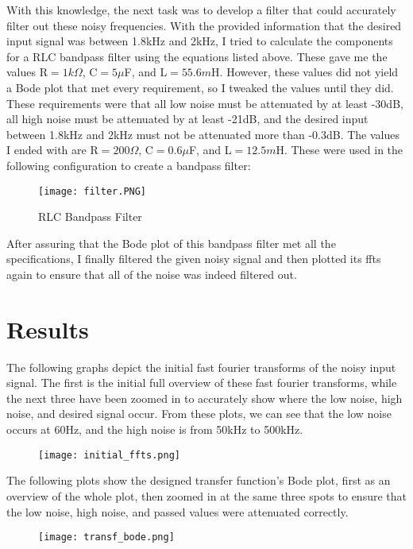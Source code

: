 \documentclass[12pt]{report}
\begin{document}
With this knowledge, the next task was to develop a filter that could accurately filter out these noisy frequencies. With the provided information that the desired input signal was between 1.8kHz and 2kHz, I tried to calculate the components for a RLC bandpass filter using the equations listed above. These gave me the values R$=1k\Omega$, C$=5\mu $F, and L$=55.6m$H. However, these values did not yield a Bode plot that met every requirement, so I tweaked the values until they did. These requirements were that all low noise must be attenuated by at least -30dB, all high noise must be attenuated by at least -21dB, and the desired input between 1.8kHz and 2kHz must not be attenuated more than -0.3dB. The values I ended with are R$=200\Omega$, C$=0.6\mu $F, and L$=12.5m$H. These were used in the following configuration to create a bandpass filter:
\begin{figure}[H]
    \centering
    \texttt{[image: filter.PNG]}
    \caption{RLC Bandpass Filter}
\end{figure}

After assuring that the Bode plot of this bandpass filter met all the specifications, I finally filtered the given noisy signal and then plotted its ffts again to ensure that all of the noise was indeed filtered out.

 \section{Results}
 
 The following graphs depict the initial fast fourier transforms of the noisy input signal. The first is the initial full overview of these fast fourier transforms, while the next three have been zoomed in to accurately show where the low noise, high noise, and desired signal occur. From these plots, we can see that the low noise occurs at 60Hz, and the high noise is from 50kHz to 500kHz.
 
\begin{figure}[H]
    \centering
    \texttt{[image: initial\_ffts.png]}
\end{figure}

The following plots show the designed transfer function's Bode plot, first as an overview of the whole plot, then zoomed in at the same three spots to ensure that the low noise, high noise, and passed values were attenuated correctly.

\begin{figure}[H]
    \centering
    \texttt{[image: transf\_bode.png]}
\end{figure}
\end{document}
